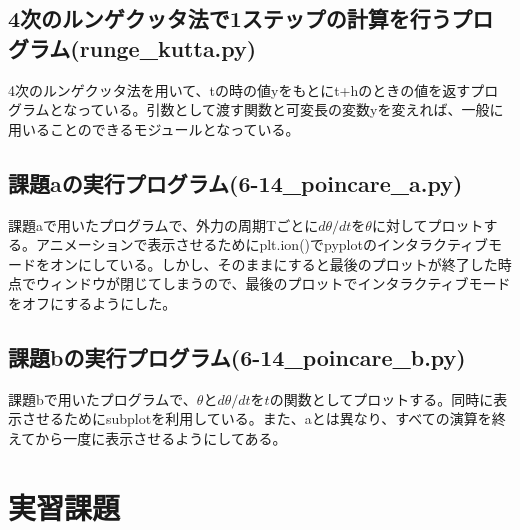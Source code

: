 \documentclass{jsarticle}
\begin{document}
        \subsection{4次のルンゲクッタ法で1ステップの計算を行うプログラム(runge\_kutta.py)}
            4次のルンゲクッタ法を用いて、tの時の値yをもとにt+hのときの値を返すプログラムとなっている。引数として渡す関数と可変長の変数yを変えれば、一般に用いることのできるモジュールとなっている。
            
        \subsection{課題aの実行プログラム(6-14\_poincare\_a.py)}
            課題aで用いたプログラムで、外力の周期Tごとに$d\theta/ dt$を$\theta$に対してプロットする。アニメーションで表示させるためにplt.ion()でpyplotのインタラクティブモードをオンにしている。しかし、そのままにすると最後のプロットが終了した時点でウィンドウが閉じてしまうので、最後のプロットでインタラクティブモードをオフにするようにした。
            
        \subsection{課題bの実行プログラム(6-14\_poincare\_b.py)}
            課題bで用いたプログラムで、$\theta$と$d\theta /dt$を$t$の関数としてプロットする。同時に表示させるためにsubplotを利用している。また、aとは異なり、すべての演算を終えてから一度に表示させるようにしてある。
            
    \section{実習課題}
    
\end{document}
